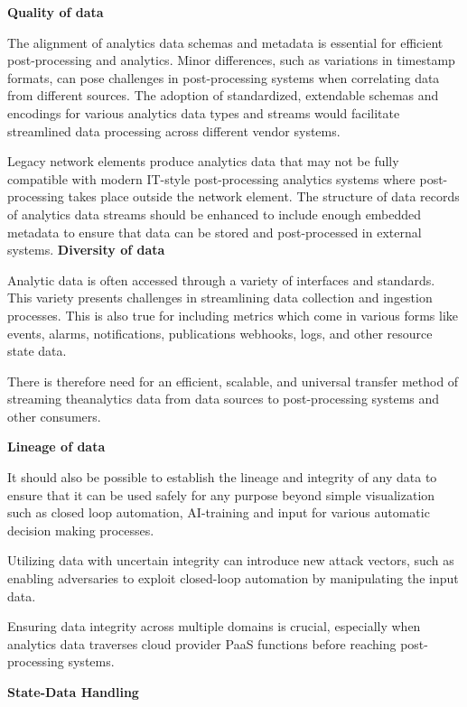 \documentclass[10pt,sigconf]{iabart}
\begin{document}

\textbf{Quality of data} 

The alignment of analytics data schemas and metadata is essential for efficient post-processing and analytics. Minor differences, such as variations in timestamp formats, can pose challenges in post-processing systems when correlating data from different sources. The adoption of standardized, extendable schemas and encodings for various analytics data types and streams would facilitate streamlined data processing across different vendor systems.

Legacy network elements produce analytics data that may not be fully compatible with modern IT-style post-processing analytics systems where post-processing takes place outside the network element. The structure of data records of analytics data streams should be enhanced to include enough embedded metadata to ensure that data can be stored and post-processed in external systems. 
\textbf{Diversity of data} 

Analytic data is often accessed through a variety of interfaces and standards. This variety presents challenges in streamlining data collection and ingestion processes. This is also true for including metrics which come in various forms like events, alarms, notifications, publications webhooks, logs, and other resource state data.

There is therefore need for an efficient, scalable, and universal transfer method of streaming theanalytics data from data sources to post-processing systems and other consumers.

\textbf{Lineage of data}

It should also be possible to establish the lineage and integrity of any data to ensure that it can be used safely for any purpose beyond simple visualization such as closed loop automation, AI-training and input for various automatic decision making processes. 

Utilizing data with uncertain integrity can introduce new attack vectors, such as enabling adversaries to exploit closed-loop automation by manipulating the input data. 

Ensuring data integrity across multiple domains is crucial, especially when analytics data traverses cloud provider PaaS functions before reaching post-processing systems.

\textbf{State-Data Handling}
\end{document}
